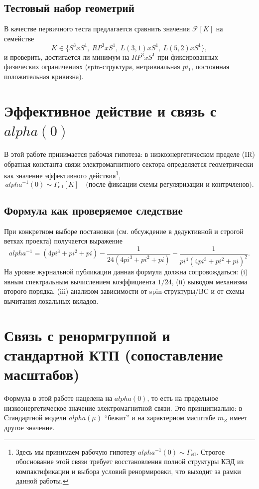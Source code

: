 \documentclass[12pt]{article}
\def\mathbb#1{#1}%
\def\alpha{alpha}%
\def\pi{pi}%
\def\times{x}%
\begin{document}
\subsection{Тестовый набор геометрий}
В качестве первичного теста предлагается сравнить значения $\mathcal{F}[K]$ на семействе
\begin{equation}
K\in\{S^3\times S^1,\ \mathbb{RP}^3\times S^1,\ L(3,1)\times S^1,\ L(5,2)\times S^1\},
\end{equation}
и проверить, достигается ли минимум на $\mathbb{RP}^3\times S^1$ при фиксированных физических ограничениях (spin-структура, нетривиальная $\pi_1$, постоянная положительная кривизна).

\section{Эффективное действие и связь с $\alpha(0)$}
В этой работе принимается рабочая гипотеза: в низкоэнергетическом пределе (IR) обратная константа связи электромагнитного сектора определяется геометрически как значение эффективного действия\footnote{Здесь мы принимаем рабочую гипотезу $\alpha^{-1}(0)\sim\Gamma_{\mathrm{eff}}$. Строгое обоснование этой связи требует восстановления полной структуры КЭД из компактификации и выбора условий ренормировки, что выходит за рамки данной работы.},
\begin{equation}
\alpha^{-1}(0) \sim \Gamma_{\mathrm{eff}}[K] \quad \text{(после фиксации схемы регуляризации и контрчленов)}.
\end{equation}

\subsection{Формула как проверяемое следствие}
При конкретном выборе постановки (см. обсуждение в дедуктивной и строгой ветках проекта) получается выражение
\begin{equation}
\alpha^{-1}
=
\left(4\pi^3+\pi^2+\pi\right)
-
\frac{1}{24\left(4\pi^3+\pi^2+\pi\right)}
-
\frac{1}{\pi^4\left(4\pi^3+\pi^2+\pi\right)^2}.
\end{equation}
На уровне журнальной публикации данная формула должна сопровождаться: (i) явным спектральным вычислением коэффициента $1/24$, (ii) выводом механизма второго порядка, (iii) анализом зависимости от spin-структуры/BC и от схемы вычитания локальных вкладов.

\section{Связь с ренормгруппой и стандартной КТП (сопоставление масштабов)}
Формула в этой работе нацелена на $\alpha(0)$, то есть на предельное низкоэнергетическое значение электромагнитной связи.
Это принципиально: в Стандартной модели $\alpha(\mu)$ ``бежит'' и на характерном масштабе $m_Z$ имеет другое значение.
\end{document}
